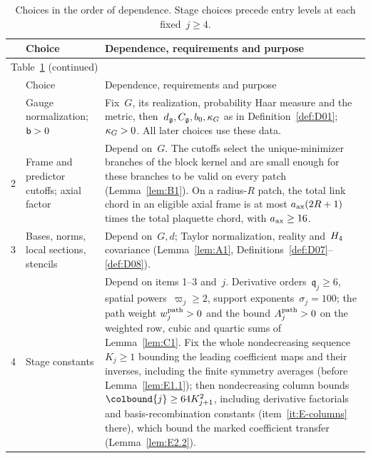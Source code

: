 \begingroup
\small
\setlength{\tabcolsep}{4pt}
\setlength{\LTpre}{0pt}
\setlength{\LTpost}{0pt}
\setlength{\LTcapwidth}{\textwidth}
\setlength{\abovecaptionskip}{3pt}
\setlength{\belowcaptionskip}{3pt}
\begin{longtable}{@{}p{}p{}p{}@{}}
\caption{Choices in the order of dependence. Stage choices precede entry levels at each fixed~$j\ge4$.}\label{tab:constant-choices}\\
\hline
 & Choice & Dependence, requirements and purpose \\
\hline
\endfirsthead
\multicolumn{3}{l}{Table~\ref{tab:constant-choices} (continued)}\\
\hline
 & Choice & Dependence, requirements and purpose \\
\hline
\endhead
\hline
\endfoot
1 & \raggedright Gauge normalization; $\mathsf{b}>0$ & Fix~$G$, its realization, probability Haar measure and the metric, then~$d_{\mathfrak{g}},C_{\mathfrak{g}},b_0,\kappa_G$ as in Definition~\ref{def:D01}; $\kappa_G>0$. All later choices use these data.\\[3pt]
2 & \raggedright Frame and predictor cutoffs; axial factor & Depend on~$G$. The cutoffs select the unique-minimizer branches of the block kernel and are small enough for these branches to be valid on every patch (Lemma~\ref{lem:B1}). On a radius-$R$ patch, the total link chord in an eligible axial frame is at most $a_{\rm ax}(2R+1)$ times the total plaquette chord, with $a_{\rm ax}\ge16$.\\[3pt]
3 & \raggedright Bases, norms, local sections, stencils & Depend on~$G,d$; Taylor normalization, reality and~$H_4$ covariance (Lemma~\ref{lem:A1}, Definitions~\ref{def:D07}--\ref{def:D08}).\\[3pt]
4 & \raggedright Stage constants & Depend on items 1--3 and~$j$. Derivative orders~$\mathfrak q_j\ge6$, spatial powers~$\varpi_j\ge2$, support exponents~$\sigma_j=100$; the path weight $w_j^{\rm path}>0$ and the bound $A_j^{\rm path}>0$ on the weighted row, cubic and quartic sums of Lemma~\ref{lem:C1}. Fix the whole nondecreasing sequence~$K_j\ge1$ bounding the leading coefficient maps and their inverses, including the finite symmetry averages (before Lemma~\ref{lem:E1.1}); then nondecreasing column bounds $\colbound{j}\ge64K_{j+1}^2$, including derivative factorials and basis-recombination constants (item~\ref{it:E-columns} there), which bound the marked coefficient transfer (Lemma~\ref{lem:E2.2}).\\[3pt]

\end{longtable}
